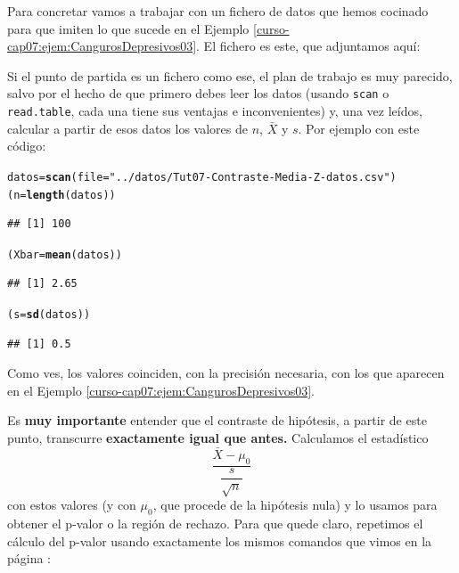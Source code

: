 \documentclass[10pt,a4paper]{article}\usepackage[]{graphicx}\usepackage[]{color}
\makeatletter
\newcommand{\hlstr}[1]{\textcolor[rgb]{0.192,0.494,0.8}{#1}}%
\newcommand{\hlstd}[1]{\textcolor[rgb]{0.345,0.345,0.345}{#1}}%
\newcommand{\hlkwb}[1]{\textcolor[rgb]{0.69,0.353,0.396}{#1}}%
\newcommand{\hlkwc}[1]{\textcolor[rgb]{0.333,0.667,0.333}{#1}}%
\newcommand{\hlkwd}[1]{\textcolor[rgb]{0.737,0.353,0.396}{\textbf{#1}}}%
\newenvironment{kframe}{%
 \def\at@end@of@kframe{}%
 \ifinner\ifhmode%
  \def\at@end@of@kframe{\end{minipage}}%
  \begin{minipage}{\columnwidth}%
 \fi\fi%
 \def\FrameCommand##1{\hskip\@totalleftmargin \hskip-\fboxsep
 \colorbox{shadecolor}{##1}\hskip-\fboxsep
     \hskip-\linewidth \hskip-\@totalleftmargin \hskip\columnwidth}%
 \MakeFramed {\advance\hsize-\width
   \@totalleftmargin\z@ \linewidth\hsize
   \@setminipage}}%
 {\par\unskip\endMakeFramed%
 \at@end@of@kframe}
\newenvironment{knitrout}{}{} %
\newcounter {cont01}
\makeatother
\begin{document}
Para concretar vamos a trabajar con un fichero de datos que hemos cocinado para que imiten lo que sucede en el Ejemplo \ref{curso-cap07:ejem:CangurosDepresivos03}. El fichero es este, que adjuntamos aquí:
\begin{center}
\end{center}

Si el punto de partida es un fichero como ese, el plan de trabajo es muy parecido, salvo por el hecho de que primero debes leer los datos (usando {\tt scan} o {\tt read.table}, cada una tiene sus ventajas e inconvenientes) y, una vez leídos, calcular a partir de esos datos los valores de $n$, $\bar X$  y $s$. Por ejemplo con este código:

\begin{knitrout}
\color{fgcolor}\begin{kframe}
\begin{alltt}
\hlstd{datos} \hlkwb{=} \hlkwd{scan}\hlstd{(}\hlkwc{file} \hlstd{=} \hlstr{"../datos/Tut07-Contraste-Media-Z-datos.csv"}\hlstd{)}
\hlstd{(n} \hlkwb{=} \hlkwd{length}\hlstd{(datos))}
\end{alltt}
\begin{verbatim}
## [1] 100
\end{verbatim}
\begin{alltt}
\hlstd{(Xbar} \hlkwb{=} \hlkwd{mean}\hlstd{(datos))}
\end{alltt}
\begin{verbatim}
## [1] 2.65
\end{verbatim}
\begin{alltt}
\hlstd{(s} \hlkwb{=} \hlkwd{sd}\hlstd{(datos))}
\end{alltt}
\begin{verbatim}
## [1] 0.5
\end{verbatim}
\end{kframe}
\end{knitrout}
Como ves, los valores coinciden, con la precisión necesaria, con los que aparecen en el Ejemplo \ref{curso-cap07:ejem:CangurosDepresivos03}.

Es {\bf muy importante} entender que el contraste de hipótesis, a partir de este punto, transcurre {\bf exactamente igual que antes.} Calculamos el estadístico
\[\dfrac{\bar X - \mu_0}{\dfrac{s}{\sqrt{n}}}\]
con estos valores (y con $\mu_0$, que procede de la hipótesis nula) y lo usamos para obtener el p-valor o la región de rechazo. Para que quede claro, repetimos el cálculo del p-valor usando exactamente los mismos comandos que vimos en la página \pageref{tut07:subsubsec:CalculoPValorEjemploCanguros}:
\end{document}
